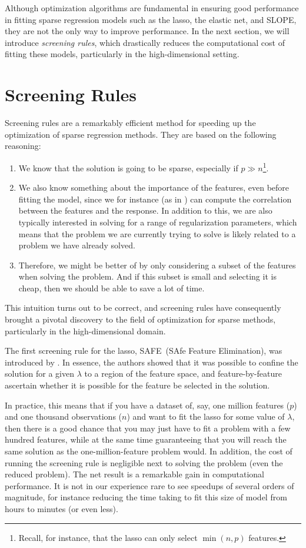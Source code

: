 Although optimization algorithms are fundamental in ensuring good performance in fitting sparse regression models such as the lasso, the elastic net, and SLOPE, they are not the only way to improve performance. In the next section, we will introduce \emph{screening rules}, which drastically reduces the computational cost of fitting these models, particularly in the high-dimensional setting.

\section{Screening Rules}\label{sec:screening-rules}

Screening rules are a remarkably efficient method for speeding up the optimization of sparse regression methods. They are based on the following reasoning:
\begin{enumerate}
  \item We know that the solution is going to be sparse, especially if \(p \gg n\)\footnote{Recall, for instance, that the lasso can only select \(\min(n, p)\) features.}.
  \item We also know something about the importance of the features, even before fitting the model, since we for instance (as in ) can compute the correlation between the features and the response. In addition to this, we are also typically interested in solving for a range of regularization parameters, which means that the problem we are currently trying to solve is likely related to a problem we have already solved.
  \item Therefore, we might be better of by only considering a subset of the features when solving the problem. And if this subset is small and selecting it is cheap, then we should be able to save a lot of time.
\end{enumerate}
This intuition turns out to be correct, and screening rules have consequently brought a pivotal discovery to the field of optimization for sparse methods, particularly in the high-dimensional domain.

The first screening rule for the lasso, SAFE~(SAfe Feature Elimination), was introduced by \textcite{elghaoui2010}. In essence, the authors showed that it was possible to confine the solution for a given \(\lambda\) to a region of the feature space, and feature-by-feature ascertain whether it is possible for the feature be selected in the solution.

In practice, this means that if you have a dataset of, say, one million features (\(p\)) and one thousand observations (\(n\)) and want to fit the lasso for some value of \(\lambda\), then there is a good chance that you may just have to fit a problem with a few hundred features, while at the same time guaranteeing that you will reach the same solution as the one-million-feature problem would. In addition, the cost of running the screening rule is negligible next to solving the problem (even the reduced problem). The net result is a remarkable gain in computational performance. It is not in our experience rare to see speedups of several orders of magnitude, for instance reducing the time taking to fit this size of model from hours to minutes (or even less).

